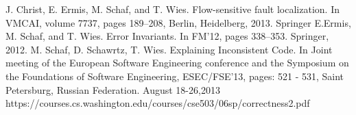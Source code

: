 \documentclass{article}
\begin{document}
\begin{thebibliography}{9}
J. Christ, E. Ermis, M. Schaf, and T. Wies. Flow-sensitive fault localization. In VMCAI, volume 7737, pages 189–208, Berlin, Heidelberg, 2013. Springer
E.Ermis, M. Schaf, and T. Wies. Error Invariants. In FM’12, pages 338–353. Springer, 2012.
M. Schaf, D. Schawrtz, T. Wies. Explaining Inconsistent Code. In Joint meeting of the European Software Engineering conference and the Symposium on the Foundations of Software Engineering, ESEC/FSE’13, pages: 521 - 531, Saint Petersburg, Russian Federation. August 18-26,2013  
https://courses.cs.washington.edu/courses/cse503/06sp/correctness2.pdf


\end{thebibliography}
\end{document}
